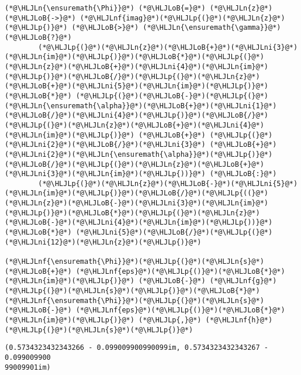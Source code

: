 \documentclass[12pt,landscape]{article}
\newcommand{\HLJLn}[1]{#1}
\newcommand{\HLJLnf}[1]{\textcolor[RGB]{66,102,213}{#1}}
\newcommand{\HLJLni}[1]{\textcolor[RGB]{59,151,46}{#1}}
\newcommand{\HLJLoB}[1]{\textcolor[RGB]{102,102,102}{\textbf{#1}}}
\newcommand{\HLJLp}[1]{#1}
\begin{document}
{\begin{lstlisting}
(*@\HLJLn{\ensuremath{\Phi}}@*) (*@\HLJLoB{=}@*) (*@\HLJLn{z}@*) (*@\HLJLoB{->}@*) (*@\HLJLnf{imag}@*)(*@\HLJLp{(}@*)(*@\HLJLn{z}@*)(*@\HLJLp{)}@*) (*@\HLJLoB{>}@*) (*@\HLJLn{\ensuremath{\gamma}}@*) (*@\HLJLoB{?}@*)
        (*@\HLJLp{(}@*)(*@\HLJLn{z}@*)(*@\HLJLoB{+}@*)(*@\HLJLni{3}@*)(*@\HLJLn{im}@*)(*@\HLJLp{)}@*)(*@\HLJLoB{*}@*)(*@\HLJLp{(}@*)(*@\HLJLn{z}@*)(*@\HLJLoB{+}@*)(*@\HLJLni{4}@*)(*@\HLJLn{im}@*)(*@\HLJLp{)}@*)(*@\HLJLoB{/}@*)(*@\HLJLp{(}@*)(*@\HLJLn{z}@*)(*@\HLJLoB{+}@*)(*@\HLJLni{5}@*)(*@\HLJLn{im}@*)(*@\HLJLp{)}@*) (*@\HLJLoB{*}@*) (*@\HLJLp{(}@*)(*@\HLJLoB{-}@*)(*@\HLJLp{(}@*)(*@\HLJLn{\ensuremath{\alpha}}@*)(*@\HLJLoB{+}@*)(*@\HLJLni{1}@*)(*@\HLJLoB{/}@*)(*@\HLJLni{4}@*)(*@\HLJLp{)}@*)(*@\HLJLoB{/}@*)(*@\HLJLp{(}@*)(*@\HLJLn{z}@*)(*@\HLJLoB{+}@*)(*@\HLJLni{4}@*)(*@\HLJLn{im}@*)(*@\HLJLp{)}@*) (*@\HLJLoB{+}@*) (*@\HLJLp{(}@*)(*@\HLJLni{2}@*)(*@\HLJLoB{/}@*)(*@\HLJLni{3}@*) (*@\HLJLoB{+}@*) (*@\HLJLni{2}@*)(*@\HLJLn{\ensuremath{\alpha}}@*)(*@\HLJLp{)}@*)(*@\HLJLoB{/}@*)(*@\HLJLp{(}@*)(*@\HLJLn{z}@*)(*@\HLJLoB{+}@*)(*@\HLJLni{3}@*)(*@\HLJLn{im}@*)(*@\HLJLp{))}@*) (*@\HLJLoB{:}@*)
        (*@\HLJLp{(}@*)(*@\HLJLn{z}@*)(*@\HLJLoB{-}@*)(*@\HLJLni{5}@*)(*@\HLJLn{im}@*)(*@\HLJLp{)}@*)(*@\HLJLoB{/}@*)(*@\HLJLp{((}@*)(*@\HLJLn{z}@*)(*@\HLJLoB{-}@*)(*@\HLJLni{3}@*)(*@\HLJLn{im}@*)(*@\HLJLp{)}@*)(*@\HLJLoB{*}@*)(*@\HLJLp{(}@*)(*@\HLJLn{z}@*)(*@\HLJLoB{-}@*)(*@\HLJLni{4}@*)(*@\HLJLn{im}@*)(*@\HLJLp{))}@*) (*@\HLJLoB{*}@*) (*@\HLJLni{5}@*)(*@\HLJLoB{/}@*)(*@\HLJLp{(}@*)(*@\HLJLni{12}@*)(*@\HLJLn{z}@*)(*@\HLJLp{)}@*)

(*@\HLJLnf{\ensuremath{\Phi}}@*)(*@\HLJLp{(}@*)(*@\HLJLn{s}@*) (*@\HLJLoB{+}@*) (*@\HLJLnf{eps}@*)(*@\HLJLp{()}@*)(*@\HLJLoB{*}@*)(*@\HLJLn{im}@*)(*@\HLJLp{)}@*) (*@\HLJLoB{-}@*) (*@\HLJLnf{g}@*)(*@\HLJLp{(}@*)(*@\HLJLn{s}@*)(*@\HLJLp{)}@*)(*@\HLJLoB{*}@*)(*@\HLJLnf{\ensuremath{\Phi}}@*)(*@\HLJLp{(}@*)(*@\HLJLn{s}@*) (*@\HLJLoB{-}@*) (*@\HLJLnf{eps}@*)(*@\HLJLp{()}@*)(*@\HLJLoB{*}@*)(*@\HLJLn{im}@*)(*@\HLJLp{)}@*) (*@\HLJLp{,}@*) (*@\HLJLnf{h}@*)(*@\HLJLp{(}@*)(*@\HLJLn{s}@*)(*@\HLJLp{)}@*)
\end{lstlisting}

\begin{lstlisting}
(0.5734323432343266 - 0.099009900990099im, 0.5734323432343267 - 0.099009900
99009901im)
\end{lstlisting}


}
\end{document}
